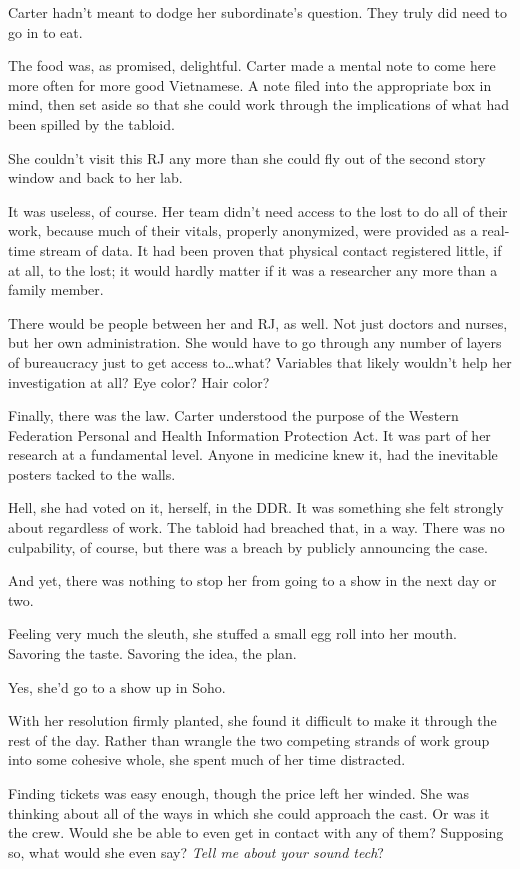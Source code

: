 Carter hadn't meant to dodge her subordinate's question. They truly did need to go in to eat.

The food was, as promised, delightful. Carter made a mental note to come here more often for more good Vietnamese. A note filed into the appropriate box in mind, then set aside so that she could work through the implications of what had been spilled by the tabloid.

She couldn't visit this RJ any more than she could fly out of the second story window and back to her lab.

It was useless, of course. Her team didn't need access to the lost to do all of their work, because much of their vitals, properly anonymized, were provided as a real-time stream of data. It had been proven that physical contact registered little, if at all, to the lost; it would hardly matter if it was a researcher any more than a family member.

There would be people between her and RJ, as well. Not just doctors and nurses, but her own administration. She would have to go through any number of layers of bureaucracy just to get access to\ldots{}what? Variables that likely wouldn't help her investigation at all? Eye color? Hair color?

Finally, there was the law. Carter understood the purpose of the Western Federation Personal and Health Information Protection Act. It was part of her research at a fundamental level. Anyone in medicine knew it, had the inevitable posters tacked to the walls.

Hell, she had voted on it, herself, in the DDR. It was something she felt strongly about regardless of work. The tabloid had breached that, in a way. There was no culpability, of course, but there was a breach by publicly announcing the case.

And yet, there was nothing to stop her from going to a show in the next day or two.

Feeling very much the sleuth, she stuffed a small egg roll into her mouth. Savoring the taste. Savoring the idea, the plan.

Yes, she'd go to a show up in Soho.

With her resolution firmly planted, she found it difficult to make it through the rest of the day. Rather than wrangle the two competing strands of work group into some cohesive whole, she spent much of her time distracted.

Finding tickets was easy enough, though the price left her winded. She was thinking about all of the ways in which she could approach the cast. Or was it the crew. Would she be able to even get in contact with any of them? Supposing so, what would she even say? \emph{Tell me about your sound tech}?

